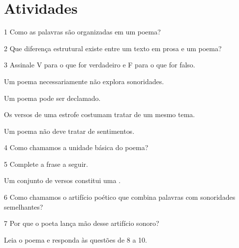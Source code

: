\section*{Atividades}

\num{1} Como as palavras são organizadas em um poema?


\num{2} Que diferença estrutural existe entre um texto em prosa e um poema?


\num{3} Assinale V para o que for verdadeiro e F para o que for falso.

\begin{boxlist}
 Um poema necessariamente não explora sonoridades.

 Um poema pode ser declamado.

 Os versos de uma estrofe costumam tratar de um mesmo tema.

 Um poema não deve tratar de sentimentos.
\end{boxlist}

\num{4} Como chamamos a unidade básica do poema?


\num{5} Complete a frase a seguir.

\begin{myquote}
Um conjunto de versos constitui uma .
\end{myquote}

\num{6} Como chamamos o artifício poético que combina palavras com
sonoridades semelhantes?



\num{7} Por que o poeta lança mão desse artifício sonoro?


\pagebreak
Leia o poema e responda às questões de 8 a 10.

